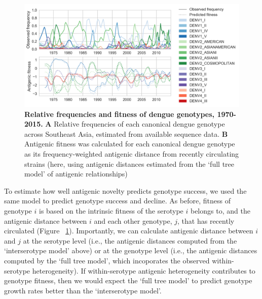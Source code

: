 \documentclass[11pt,oneside,letterpaper]{article}
\begin{document}
\begin{figure}[h]
  \begin{centering}
\includegraphics[width=\linewidth]{../figures/png/genotype-fitness.png}
    \caption{\textbf{Relative frequencies and fitness of dengue genotypes, 1970-2015.}  \textbf{A} Relative frequencies of each canonical dengue genotype across Southeast Asia, estimated from available sequence data. \textbf{B} Antigenic fitness was calculated for each canonical dengue genotype as its frequency-weighted antigenic distance from recently circulating strains (here, using antigenic distances estimated from the `full tree model' of antigenic relationships)}
     \label{genotype_fitness}
   \end{centering}
\end{figure}

To estimate how well antigenic novelty predicts genotype success, we used the same model to predict genotype success and decline.
As before, fitness of genotype $i$ is based on the intrinsic fitness of the serotype $i$ belongs to, and the antigenic distance between $i$ and each other genotype, $j$, that has recently circulated (Figure ~\ref{genotype_fitness}).
Importantly, we can calculate antigenic distance between $i$ and $j$ at the serotype level (i.e., the antigenic distances computed from the `interserotype model' above) or at the genotype level (i.e., the antigenic distances computed by the `full tree model', which incoporates the observed within-serotype heterogeneity).
If within-serotype antigenic heterogeneity contributes to genotype fitness, then we would expect the `full tree model' to predict genotype growth rates better than the `interserotype model'.
\end{document}
